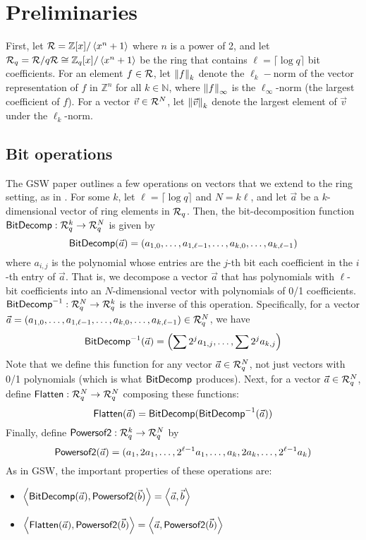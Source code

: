\section{Preliminaries}

First, let $\R = \mathbb{Z}[x] / \left<x^n + 1\right>$ where $n$ is a power of 2, and let $\Rq = \R/q\R \cong \mathbb{Z}_q[x] / \left<x^n + 1\right> $ be the ring that contains $\ell = \lceil\log q\rceil$ bit coefficients.  For an element $f \in \R$, let $\norm{k}{f}$ denote the $\ell_k-$norm of the vector representation of $f$ in $\mathbb{Z}^n$ for all $k \in \mathbb{N}$, where $\norm{\infty}{f}$ is the $\ell_\infty$-norm (the largest coefficient of $f$).  For a vector $\vec{v} \in \R^N$, let $\norm{k}{\vec{v}}$ denote the largest element of $\vec{v}$ under the $\ell_k$-norm.

\subsection{Bit operations}

The GSW paper outlines a few operations on vectors that we extend to the ring setting, as in \cite{shield}.  For some $k$, let $\ell = \lceil \log q \rceil$ and $N = k\ell$, and let $\vec{a}$ be a $k$-dimensional vector of ring elements in $\Rq$.  Then, the bit-decomposition function $\bdfn: \Rq^k \to \Rq^N$ is given by $$\bdfn(\vec{a}) = (a_{1,0}, \ldots, a_{1, \ell-1}, \ldots, a_{k, 0}, \ldots, a_{k, \ell-1})$$ where $a_{i,j}$ is the polynomial whose entries are the $j$-th bit each coefficient in the $i$-th entry of $\vec{a}$.  That is, we decompose a vector $\vec{a}$ that has polynomials with $\ell$-bit coefficients into an $N$-dimensional vector with polynomials of 0/1 coefficients.  $\bdifn: \Rq^N \to \Rq^k$ is the inverse of this operation.  Specifically, for a vector $\vec{a} = (a_{1,0}, \ldots, a_{1, \ell-1}, \ldots, a_{k, 0}, \ldots, a_{k, \ell-1}) \in \Rq^N$, we have $$\bdifn(\vec{a}) = \left(\sum 2^j a_{1,j}, \ldots, \sum 2^j a_{k, j}\right)$$  Note that we define this function for any vector $\vec{a} \in \Rq^N$, not just vectors with 0/1 polynomials (which is what $\bdfn$ produces).  Next, for a vector $\vec{a} \in \Rq^N$, define $\flattenfn: \Rq^N \to \Rq^N$ composing these functions: $$\flattenfn(\vec{a}) = \bdfn(\bdifn(\vec{a}))$$  Finally, define $\powfn: \Rq^k \to \Rq^N$ by $$\powfn(\vec{a}) = (a_1, 2a_1, \ldots, 2^{\ell-1}a_1, \ldots, a_k, 2a_k, \ldots, 2^{\ell-1}a_k)$$  As in GSW, the important properties of these operations are:

\begin{itemize}
\item $\left< \bdfn(\vec{a}), \powfn(\vec{b}) \right> = \left< \vec{a}, \vec{b} \right>$
\item $\left< \flattenfn(\vec{a}), \powfn(\vec{b}) \right> = \left< \vec{a}, \powfn(\vec{b}) \right>$
\end{itemize}

